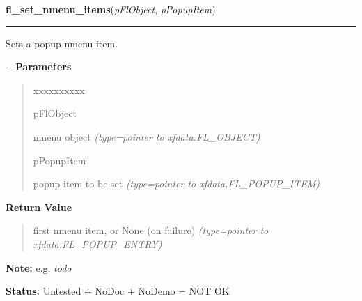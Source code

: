     \vspace{0.5ex}

\hspace{.8\funcindent}\begin{boxedminipage}{\funcwidth}

    \raggedright \textbf{fl\_set\_nmenu\_items}(\textit{pFlObject}, \textit{pPopupItem})

    \vspace{-1.5ex}

    \rule{\textwidth}{0.5\fboxrule}
\setlength{\parskip}{2ex}

Sets a popup nmenu item.

-{}-
\setlength{\parskip}{1ex}
      \textbf{Parameters}
      \vspace{-1ex}

      \begin{quote}
        \begin{Ventry}{xxxxxxxxxx}

          \item[pFlObject]


nmenu object
            {\it (type=pointer to xfdata.FL\_OBJECT)}

          \item[pPopupItem]


popup item to be set
            {\it (type=pointer to xfdata.FL\_POPUP\_ITEM)}

        \end{Ventry}

      \end{quote}

      \textbf{Return Value}
    \vspace{-1ex}

      \begin{quote}

first nmenu item, or None (on failure)
      {\it (type=pointer to xfdata.FL\_POPUP\_ENTRY)}

      \end{quote}

\textbf{Note:} 
e.g. \emph{todo}


\textbf{Status:} 
Untested + NoDoc + NoDemo = NOT OK


    \end{boxedminipage}

    \label{xformslib:flnmenu:fl_add_nmenu_items2}


